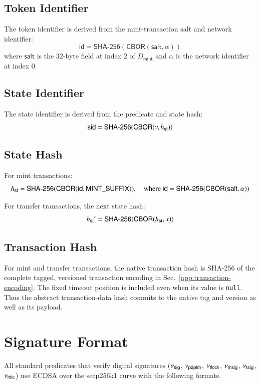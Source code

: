 \subsection{Token Identifier}

The token identifier is derived from the mint-transaction salt and network identifier:
\[
\mathsf{id} = \mathsf{SHA\text{-}256}(\mathsf{CBOR}(\mathsf{salt}, \alpha))
\]
where $\mathsf{salt}$ is the 32-byte field at index 2 of $D_\mathsf{mint}$ and $\alpha$ is the network identifier at index 0.

\subsection{State Identifier}

The state identifier is derived from the predicate and state hash:
\[
\mathsf{sid} = \mathsf{SHA\text{-}256}(\mathsf{CBOR}(\nu, {h_\mathsf{st}}))
\]

\subsection{State Hash}

For mint transactions:
\[
{h_\mathsf{st}} = \mathsf{SHA\text{-}256}(\mathsf{CBOR}(\mathsf{id}, \mathsf{MINT\_SUFFIX})), \quad \text{where } \mathsf{id} = \mathsf{SHA\text{-}256}(\mathsf{CBOR}(\mathsf{salt}, \alpha))
\]

For transfer transactions, the next state hash:
\[
{h_\mathsf{st}}' = \mathsf{SHA\text{-}256}(\mathsf{CBOR}({h_\mathsf{st}}, x))
\]

\subsection{Transaction Hash}

For mint and transfer transactions, the native transaction hash is SHA-256 of the complete tagged, versioned transaction encoding in Sec.~\ref{app:transaction-encoding}. The fixed timeout position is included even when its value is \texttt{null}. Thus the abstract transaction-data hash commits to the native tag and version as well as its payload.


\section{Signature Format}\label{app:signature-format}

All standard predicates that verify digital signatures ($\nu_\mathsf{sig}$, $\nu_\mathsf{p2pkh}$, $\nu_\mathsf{tlock}$, $\nu_\mathsf{msig}$, $\nu_\mathsf{tsig}$, $\nu_\mathsf{htlc}$) use ECDSA over the secp256k1 curve with the following formats.

